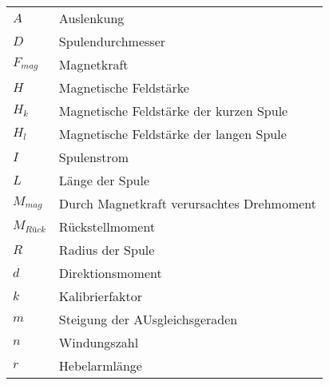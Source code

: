 
\begin{table}[h]
    \begin{tabular}{@{}ll@{}}
        \(A\)           & Auslenkung                                                                          \\
        \(D\)           & Spulendurchmesser                                                                   \\
        \(F_{mag}\)   & Magnetkraft                                                                         \\
        \(H\)           & Magnetische Feldstärke                                                              \\
        \(H_k\)         & Magnetische Feldstärke der kurzen Spule                                             \\
        \(H_l\)         & Magnetische Feldstärke der langen Spule                                             \\
        \(I\)           & Spulenstrom                                                                         \\
        \(L\)           & Länge der Spule                                                                     \\
        \(M_{mag}\)   & Durch Magnetkraft verursachtes Drehmoment                                           \\
        \(M_{Rück}\)  & Rückstellmoment                                                                     \\
        \(R\)           & Radius der Spule                                                                    \\
        \(d\)           & Direktionsmoment                                                                    \\
        \(k\)           & Kalibrierfaktor                                                                     \\
        \(m\)           & Steigung der AUsgleichsgeraden                                                      \\
        \(n\)           & Windungszahl                                                                        \\
        \(r\)           & Hebelarmlänge                                                                       \\

\end{tabular}
\end{table}
